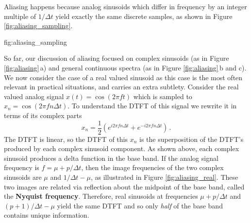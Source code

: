 Aliasing happens because analog sinusoids which differ in frequency by an integer multiple of $1/\Delta t$ yield exactly the same discrete samples, as shown in Figure \ref{fig:aliasing_sampling}.

{fig:aliasing_sampling}

So far, our discussion of aliasing focused on complex sinusoids (as in Figure \ref{fig:aliasing}\,a) and general continuous spectra (as in Figure \ref{fig:aliasing}\,b and c).
We now consider the case of a real valued sinusoid as this case is the most often relevant in practical situations, and carries an extra subtlety.
Consider the real valued analog signal $x(t) = \cos(2 \pi f t)$ which is sampled to $x_n = \cos(2 \pi f n \Delta t)$.
To understand the DTFT of this signal we rewrite it in terms of its complex parts
\begin{equation}
x_n = \frac{1}{2} \left( e^{i 2 \pi f n \Delta t} + e^{-i 2 \pi f n \Delta t} \right) \, .
\end{equation}
The DTFT is linear, so the DTFT of this $x_n$ is the superposition of the DTFT's produced by each complex sinusoid component.
As shown above, each complex sinusoid produces a delta function in the base band.
If the analog signal frequency is $f = \mu + p/\Delta t$, then the image frequencies of the two complex sinusoids are $\mu$ and $1/\Delta t - \mu$, as illustrated in Figure \ref{fig:aliasing_real}.
These two images are related via reflection about the midpoint of the base band, called the \textbf{Nyquist frequency}.
Therefore, real sinusoids at frequencies $\mu + p/\Delta t$ and $(p+1)/\Delta t - \mu$ yield the same DTFT and so only \emph{half} of the base band contains unique information.


